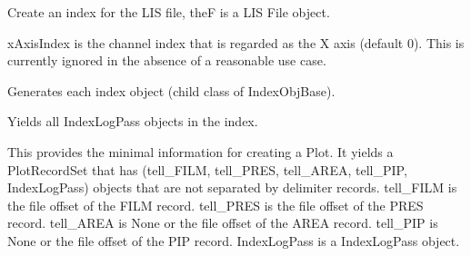 \documentclass[letterpaper,10pt,english]{sphinxmanual}
\begin{document}
\begin{fulllineitems}
\label{\detokenize{ref/LIS/core/FileIndexer:TotalDepth.LIS.core.FileIndexer.FileIndex}}
Create an index for the LIS file, theF is a LIS File object.

xAxisIndex is the channel index that is regarded as the X axis (default 0).
This is currently ignored in the absence of a reasonable use case.

\begin{fulllineitems}
\label{\detokenize{ref/LIS/core/FileIndexer:TotalDepth.LIS.core.FileIndexer.FileIndex.genAll}}
Generates each index object (child class of IndexObjBase).

\end{fulllineitems}


\begin{fulllineitems}
\label{\detokenize{ref/LIS/core/FileIndexer:TotalDepth.LIS.core.FileIndexer.FileIndex.genLogPasses}}
Yields all IndexLogPass objects in the index.

\end{fulllineitems}


\begin{fulllineitems}
\label{\detokenize{ref/LIS/core/FileIndexer:TotalDepth.LIS.core.FileIndexer.FileIndex.genPlotRecords}}
This provides the minimal information for creating a Plot. It yields
a PlotRecordSet that has (tell\_FILM, tell\_PRES, tell\_AREA, tell\_PIP, IndexLogPass) objects that are not
separated by delimiter records.
tell\_FILM is the file offset of the FILM record.
tell\_PRES is the file offset of the PRES record.
tell\_AREA is None or the file offset of the AREA record.
tell\_PIP is None or the file offset of the PIP record.
IndexLogPass is a IndexLogPass object.

\end{fulllineitems}


\end{fulllineitems}
\end{document}
